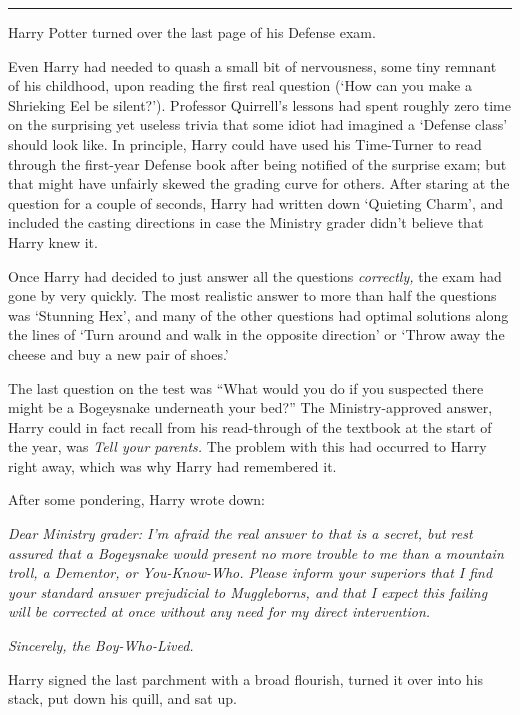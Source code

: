\begin{center}\rule{3in}{0.4pt}\end{center}

Harry Potter turned over the last page of his Defense exam.

Even Harry had needed to quash a small bit of nervousness, some tiny
remnant of his childhood, upon reading the first real question (`How can
you make a Shrieking Eel be silent?'). Professor Quirrell's lessons had
spent roughly zero time on the surprising yet useless trivia that some
idiot had imagined a `Defense class' should look like. In principle,
Harry could have used his Time-Turner to read through the first-year
Defense book after being notified of the surprise exam; but that might
have unfairly skewed the grading curve for others. After staring at the
question for a couple of seconds, Harry had written down `Quieting
Charm', and included the casting directions in case the Ministry grader
didn't believe that Harry knew it.

Once Harry had decided to just answer all the questions
\emph{correctly,} the exam had gone by very quickly. The most realistic
answer to more than half the questions was `Stunning Hex', and many of
the other questions had optimal solutions along the lines of `Turn
around and walk in the opposite direction' or `Throw away the cheese and
buy a new pair of shoes.'

The last question on the test was ``What would you do if you suspected
there might be a Bogeysnake underneath your bed?'' The Ministry-approved
answer, Harry could in fact recall from his read-through of the textbook
at the start of the year, was \emph{Tell your parents.} The problem with
this had occurred to Harry right away, which was why Harry had
remembered it.

After some pondering, Harry wrote down:

\emph{Dear Ministry grader: I'm afraid the real answer to that is a
secret, but rest assured that a Bogeysnake would present no more trouble
to me than a mountain troll, a Dementor, or You-Know-Who. Please inform
your superiors that I find your standard answer prejudicial to
Muggleborns, and that I expect this failing will be corrected at once
without any need for my direct intervention.}

\emph{Sincerely, the Boy-Who-Lived.}

Harry signed the last parchment with a broad flourish, turned it over
into his stack, put down his quill, and sat up.

